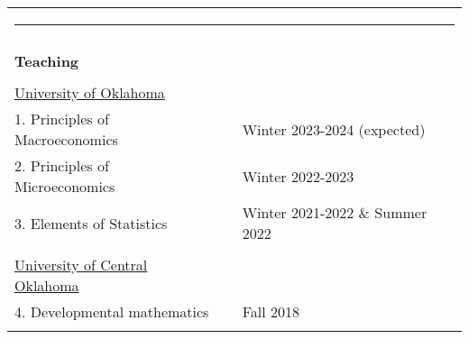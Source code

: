 \documentclass[10pt,letterpaper]{article}
\begin{document}
\begin{tabular}{p{3.25in}p{1.5in}p{6.25in}}
\multicolumn{3}{p{7.5in}}{\hrule}\\
\\
{\textbf{\large{Teaching }}} &\\
\\
\underline{University of Oklahoma }                        &                   & \vspace{0.25 cm}\\
1.  Principles of Macroeconomics             &               & Winter 2023-2024 (expected)\\
2.  Principles of Microeconomics             &               & Winter 2022-2023\\
3. Elements of Statistics             &               & Winter 2021-2022 \& Summer 2022\\
\\
\underline{University of Central Oklahoma}                       &                    & \vspace{0.25 cm}\\
4.  Developmental mathematics                  &              & Fall 2018 \\
\\



\end{tabular}




\end{document}
